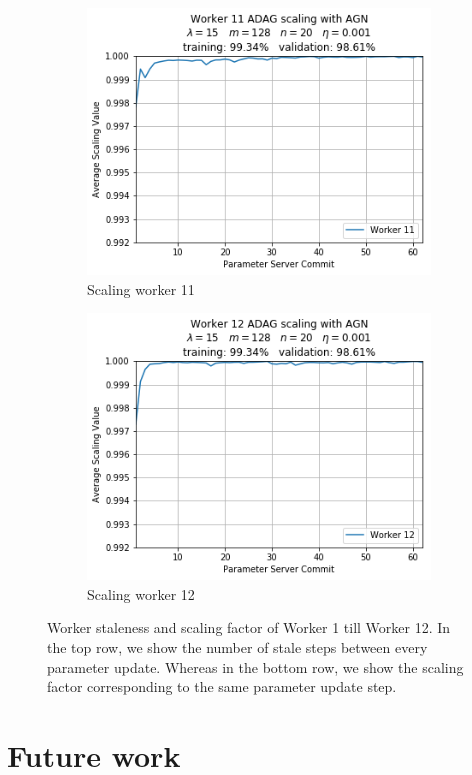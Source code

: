 \begin{figure}
\begin{subfigure}{.24\textwidth}
    \includegraphics[width=\linewidth]{resources/images/plots/adag_agn_mnist/epoch_40/15/001/scaling/worker_11}
    \caption{Scaling worker 11}
  \end{subfigure}
  \begin{subfigure}{.24\textwidth}
    \centering
    \includegraphics[width=\linewidth]{resources/images/plots/adag_agn_mnist/epoch_40/15/001/scaling/worker_12}
    \caption{Scaling worker 12}
  \end{subfigure}
  \caption{Worker staleness and scaling factor of Worker 1 till Worker 12. In the top row, we show the number of stale steps between every parameter update. Whereas in the bottom row, we show the scaling factor corresponding to the same parameter update step.}
  \label{fig:adag_worker_staleness_and_scaling}
\end{figure}

\section{Future work}
\label{sec:adag_future_work}
